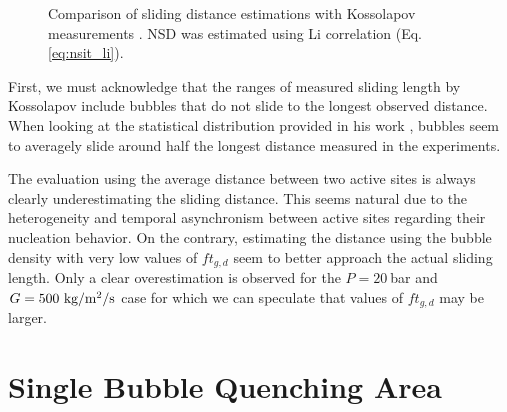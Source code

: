 \begin{figure}[!h]
\caption{Comparison of sliding distance estimations with Kossolapov measurements \cite{kossolapov_experimental_2021}. NSD was estimated using Li \etal correlation (Eq. \ref{eq:nsit_li}).}
\label{fig:lsl_koss}
\end{figure}


\npar

First, we must acknowledge that the ranges of measured sliding length by Kossolapov include bubbles that do not slide to the longest observed distance. When looking at the statistical distribution provided in his work \cite{kossolapov_experimental_2021}, bubbles seem to averagely slide around half the longest distance measured in the experiments.

\npar
The evaluation using the average distance between two active sites is always clearly underestimating the sliding distance. This seems natural due to the heterogeneity and temporal asynchronism between active sites regarding their nucleation behavior. On the contrary, estimating the distance using the bubble density with very low values of $ft_{g,d}$ seem to better approach the actual sliding length. Only a clear overestimation is observed for the $P=20\ $bar and $G=500\ \text{kg/m$^{2}$/s}$ case for which we can speculate that values of $ft_{g,d}$ may be larger.


\section{Single Bubble Quenching Area}
\label{sec:quench_area}


